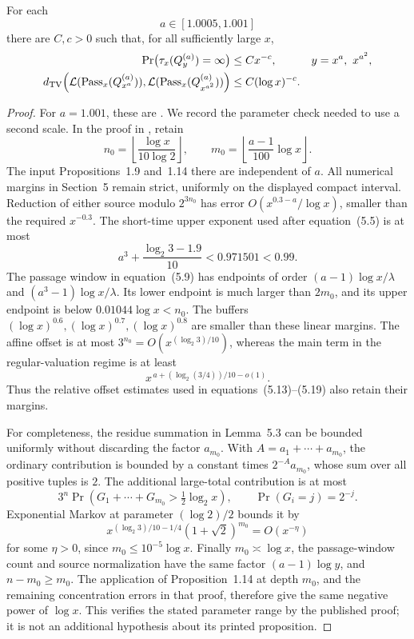 \begin{proposition}
\label{prop:ct-tao-input}
For each
\[
 a\in[1.0005,1.001]
\]
there are \(C,c>0\) such that, for all sufficiently large \(x\),
\begin{align}
 \Pr\bigl(\tau_x(Q_y^{(a)})=\infty\bigr)&\le Cx^{-c},
       &&y=x^a,\ x^{a^2},\label{eq:ct-tao-failure}\\
 d_{\rm TV}\!\left(
 \mathcal L(\operatorname{Pass}_x(Q_{x^a}^{(a)})),
 \mathcal L(\operatorname{Pass}_x(Q_{x^{a^2}}^{(a)}))
 \right)&\le C(\log x)^{-c}.\label{eq:ct-tao-tv}
\end{align}
\end{proposition}
\begin{proof}
For \(a=1.001\), these are
\cite[Proposition~1.11, equations~(1.19)--(1.20)]{Tao2022}.
We record the parameter check needed to use a second scale.
In the proof in \cite[Section~5]{Tao2022}, retain
\[
 n_0=\left\lfloor\frac{\log x}{10\log2}\right\rfloor,
 \qquad
 m_0=\left\lfloor\frac{a-1}{100}\log x\right\rfloor.
\]
The input Propositions~1.9 and~1.14 there are independent of \(a\).
All numerical margins in Section~5 remain strict, uniformly on the
displayed compact interval. Reduction of either source modulo
\(2^{3n_0}\) has error
\(O(x^{0.3-a}/\log x)\), smaller than the required \(x^{-0.3}\).
The short-time upper exponent used after equation~(5.5) is at most
\[
 a^3+\frac{\log_2 3-1.9}{10}<0.971501<0.99.
\]
The passage window in equation~(5.9) has endpoints of order
\((a-1)\log x/\lambda\) and
\((a^3-1)\log x/\lambda\). Its lower endpoint is much larger
than \(2m_0\), and its upper endpoint is below
\(0.01044\log x<n_0\). The buffers
\((\log x)^{0.6},(\log x)^{0.7},(\log x)^{0.8}\) are smaller
than these linear margins. The affine offset is at most
\(3^{n_0}=O(x^{(\log_2 3)/10})\), whereas the main term in the
regular-valuation regime is at least
\[
 x^{\,a+(\log_2(3/4))/10-o(1)}.
\]
Thus the relative offset estimates used in equations~(5.13)--(5.19)
also retain their margins.

For completeness, the residue summation in Lemma~5.3 can be bounded
uniformly without discarding the factor \(a_{m_0}\).
With \(A=a_1+\cdots+a_{m_0}\), the ordinary contribution is bounded
by a constant times \(2^{-A}a_{m_0}\), whose sum over all positive
tuples is \(2\). The additional large-total contribution is at most
\[
 3^n\Pr(G_1+\cdots+G_{m_0}>\tfrac12\log_2x),
 \qquad \Pr(G_i=j)=2^{-j}.
\]
Exponential Markov at parameter \((\log2)/2\) bounds it by
\[
 x^{(\log_2 3)/10-1/4}(1+\sqrt2)^{m_0}=O(x^{-\eta})
\]
for some \(\eta>0\), since \(m_0\le10^{-5}\log x\).
Finally \(m_0\asymp\log x\), the passage-window count and source
normalization have the same factor \((a-1)\log y\), and
\(n-m_0\ge m_0\). The application of Proposition~1.14 at depth
\(m_0\), and the remaining concentration errors in that proof,
therefore give the same negative power of \(\log x\).
This verifies the stated parameter range by the published proof;
it is not an additional hypothesis about its printed proposition.
\end{proof}

